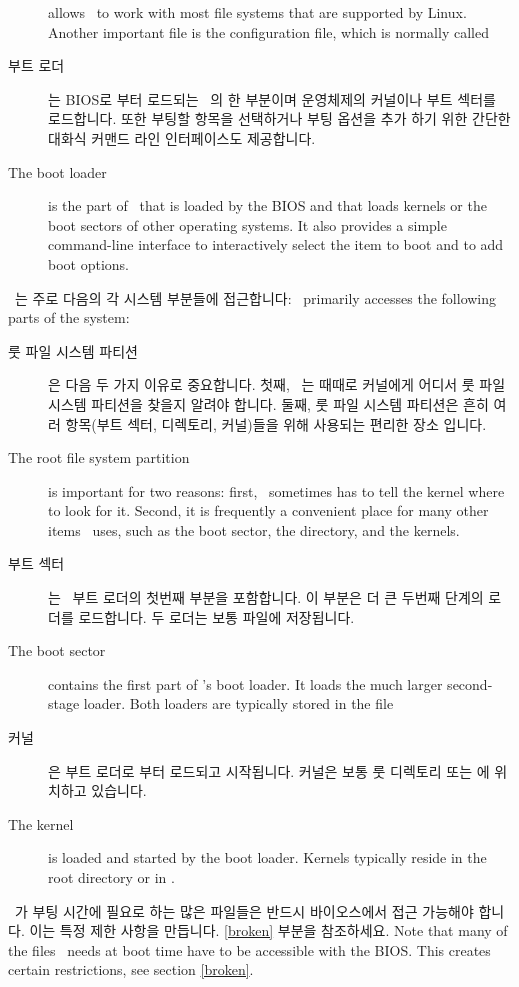 \begin{description}
{    allows \LILO\ to work with most file systems that are supported by
    Linux.} Another important file is the configuration file, which is
    normally called 
  \item[부트 로더] 는 BIOS로 부터 로드되는 \LILO\ 의 한 부분이며 운영체제의 커널이나 부트 섹터를 로드합니다. 또한 부팅할 항목을 선택하거나 부팅 옵션을 추가 하기 위한 간단한 대화식 커맨드 라인 인터페이스도 제공합니다.
  \item[The boot loader] is the part of \LILO\ that is loaded by the BIOS
    and that loads kernels or the boot sectors of other operating systems.
    It also provides a simple command-line interface to interactively
    select the item to boot and to add boot options.
\end{description}

\LILO\ 는 주로 다음의 각 시스템 부분들에 접근합니다:
\LILO\ primarily accesses the following parts of the system:

\begin{description}
  \item[룻 파일 시스템 파티션] 은 다음 두 가지 이유로 중요합니다. 첫째, \LILO\ 는 때때로 커널에게 어디서 룻 파일 시스템 파티션을 찾을지 알려야 합니다. 둘째, 룻 파일 시스템 파티션은 흔히 여러 항목(부트 섹터,  디렉토리, 커널)들을 위해 사용되는 편리한 장소 입니다. 
  \item[The root file system partition] is important for two reasons: first,
    \LILO\ sometimes has to tell the kernel where to look for it. Second, it
    is frequently a convenient place for many other items \LILO\ uses, such
    as the boot sector, the  directory, and the kernels.
  \item[부트 섹터] 는 \LILO\ 부트 로더의 첫번째 부분을 포함합니다. 이 부분은 더 큰 두번째 단계의 로더를 로드합니다. 두 로더는 보통  파일에 저장됩니다.
  \item[The boot sector] contains the first part of \LILO's boot loader. It
    loads the much larger second-stage loader. Both loaders are typically
    stored in the file 
  \item[커널] 은 부트 로더로 부터 로드되고 시작됩니다. 커널은 보통 룻 디렉토리 또는  에 위치하고 있습니다.
  \item[The kernel] is loaded and started by the boot loader. Kernels
    typically reside in the root directory or in .
\end{description}

\LILO\ 가 부팅 시간에 필요로 하는 많은 파일들은 반드시 바이오스에서 접근 가능해야 합니다. 이는 특정 제한 사항을 만듭니다. \ref{broken} 부분을 참조하세요.
Note that many of the files \LILO\ needs at boot time have to be accessible
with the BIOS. This creates certain restrictions, see section \ref{broken}.


